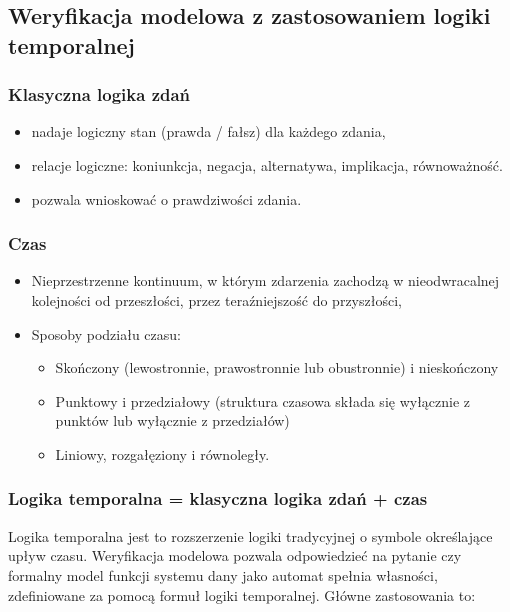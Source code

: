 \subsection{Weryfikacja modelowa z zastosowaniem logiki temporalnej}

\subsubsection{Klasyczna logika zdań}

\begin{itemize}
	\item nadaje logiczny stan (prawda / fałsz) dla każdego zdania,
	\item relacje logiczne: koniunkcja, negacja, alternatywa, implikacja, równoważność.
	\item pozwala wnioskować o prawdziwości zdania.
\end{itemize}

\subsubsection{Czas}

\begin{itemize}
	\item Nieprzestrzenne kontinuum, w którym zdarzenia zachodzą w nieodwracalnej kolejności od przeszłości, przez teraźniejszość do przyszłości,
	\item Sposoby podziału czasu:
	\begin{itemize}
		\item Skończony (lewostronnie, prawostronnie lub obustronnie) i nieskończony
		\item Punktowy i przedziałowy (struktura czasowa składa się wyłącznie z punktów lub wyłącznie z przedziałów)

		\item Liniowy, rozgałęziony i równoległy.
	\end{itemize}
\end{itemize}

\subsubsection{Logika temporalna = klasyczna logika zdań + czas}

Logika temporalna jest to rozszerzenie logiki tradycyjnej o symbole określające upływ czasu. Weryfikacja modelowa pozwala odpowiedzieć na pytanie czy formalny model funkcji systemu dany jako automat spełnia własności, zdefiniowane za pomocą formuł logiki temporalnej. Główne zastosowania to:

